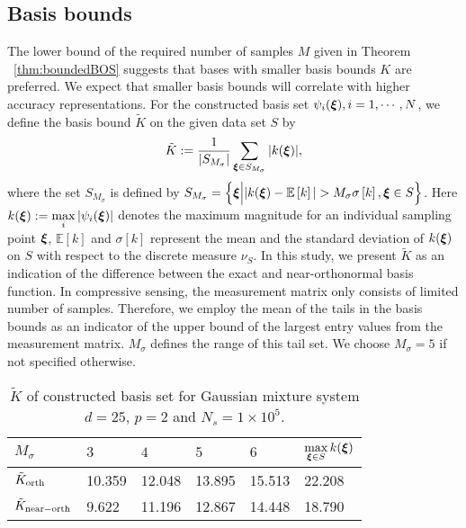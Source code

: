 \subsection{Basis bounds}
The lower bound of the required number of samples $M$ given in Theorem \ \ref{thm:boundedBOS} suggests that bases with smaller basis bounds $K$ are preferred.
We expect that smaller basis bounds will correlate with higher accuracy representations.
For the constructed basis set $\psi_i(\bm\xi), i = 1,\cdots, N$, we define the basis 
bound $\tilde{K}$ on the given data set $S$ by
\begin{equation}\label{eq:basis_bound}
\tilde{K} := \frac{1}{\vert S_{M_{\sigma}}\vert} \sum_{\bm\xi\in S_{M_{\sigma}}}\vert k(\bm\xi)\vert,
\end{equation}
where the set $S_{M_{\sigma}}$ is defined by $S_{M_{\sigma}} = \left
\{\bm\xi\Big\vert \vert k(\bm\xi) - \mathbb{E}\left[k\right]\vert > M_{\sigma} \sigma\left[k\right], \bm\xi \in S\right\}$. 
Here $\displaystyle k(\bm\xi) :=\mathop{\max}_{i} \vert \psi_i(\bm\xi) \vert$ denotes the maximum magnitude for 
an individual sampling point $\bm\xi$, $\mathbb{E}\left[k\right]$ and $\sigma\left[k\right]$  represent the 
mean and the standard deviation of $k(\bm\xi)$ on $S$ with respect to the discrete measure $\nu_S$.
In this study, we present $\tilde{K}$ as an indication of the difference between the exact and near-orthonormal basis function. 
In compressive sensing, the measurement matrix only consists of limited number of samples. Therefore, we 
employ the mean of the tails in the basis bounds as an indicator of the upper bound of the largest 
entry values from the measurement matrix. $M_{\sigma}$ defines the range of this tail set. 
We choose $M_{\sigma} = 5$ if not specified otherwise.

\begin{table}[!h]
\centering
\caption{$\tilde{K}$ of constructed basis set for Gaussian mixture system $d = 25$, $p = 2$ and $N_s = 1\times 10^5$.}
\begin{tabular}{C{8em}|C{6em} C{6em} C{6em} C{6em} C{6em}}
\hline\hline
$M_{\sigma}$ & $3$ & $4$ & $5$ & $6$ &$ \displaystyle \mathop{\max}_{\bm\xi\in S} k(\bm\xi)$ \\
\hline
$\tilde{K}_{\rm orth}$ & 10.359 & 12.048 & 13.895 & 15.513 & 22.208\\ 
$\tilde{K}_{\rm near-orth}$ & 9.622 & 11.196 & 12.867 & 14.448 & 18.790\\ 
\hline\hline
\end{tabular}
\label{tab:GM_d_25_p_2}
\end{table}

